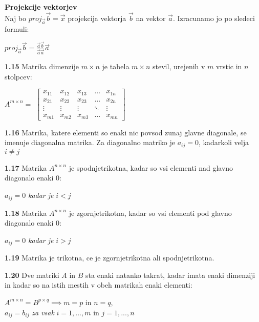 \documentclass{article}
\begin{document}
\begin{multicols}{4}
\textbf{Projekcije vektorjev}\\
Naj bo $proj_{\vec{a}}\vec{b} = \vec{x}$ projekcija vektorja $\vec{b}$ na vektor $\vec{a}$.
Izracunamo jo po sledeci formuli:
\begin{center}
    \begin{math}
        proj_{\vec{a}}\vec{b} = \frac{\vec{a}\vec{b}}{\vec{a}\vec{a}} \vec{a}
    \end{math}
\end{center}

\textbf{1.15} Matrika dimenzije $m \times n$ je tabela $m \times n$ stevil, urejenih
v $m$ vrstic in $n$ stolpcev:
\begin{center}
    $A^{m \times n} =$
    $\begin{bmatrix}
        x_{11} & x_{12} & x_{13} & \dots  & x_{1n} \\
        x_{21} & x_{22} & x_{23} & \dots  & x_{2n} \\
        \vdots & \vdots & \vdots & \ddots & \vdots \\
        x_{m1} & x_{m2} & x_{m3} & \dots  & x_{mn}
    \end{bmatrix}$
\end{center}

\textbf{1.16} Matrika, katere elementi so enaki nic povsod
zunaj glavne diagonale, se imenuje diagonalna matrika. Za
diagonalno matriko je $a_{ij} = 0$, kadarkoli velja $i \neq j$

\textbf{1.17} Matrika $A^{n \times n}$ je spodnjetrikotna, kadar
so vsi elementi nad glavno diagonalo enaki 0:
\begin{center}
    $a_{ij} = 0$  \textit{kadar je} $i < j$
\end{center}

\textbf{1.18} Matrika $A^{n \times n}$ je zgornjetrikotna, kadar
so vsi elementi pod glavno diagonalo enaki 0:
\begin{center}
    $a_{ij} = 0$  \textit{kadar je} $i > j$
\end{center}

\textbf{1.19} Matrika je trikotna, ce je zgornjetrikotna ali spodnjetrikotna.

\textbf{1.20} Dve matriki $A$ in $B$ sta enaki natanko takrat,
kadar imata enaki dimenziji in kadar so na istih mestih v obeh
matrikah enaki elementi:
\begin{center}
    $A^{m \times n} = B^{p \times q} \implies m=p$ in $n=q$,\\
    $a_{ij} = b_{ij}$ \textit{za vsak} $i= 1,...,m$ in $j=1,...,n$ 
\end{center}


\end{multicols}
\end{document}
